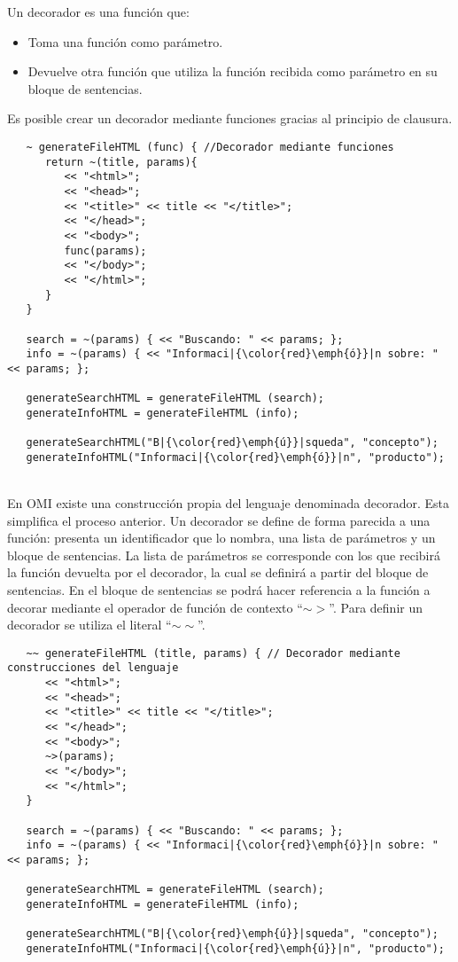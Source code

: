 Un decorador es una función que:
\begin{itemize}
\item Toma una función como parámetro. 
\item Devuelve otra función que utiliza la función recibida como parámetro en su bloque de sentencias.
\end{itemize}

Es posible crear un decorador mediante funciones gracias al principio de clausura. \\

\begin{lstlisting}
   ~ generateFileHTML (func) { //Decorador mediante funciones
      return ~(title, params){
         << "<html>";
         << "<head>";
         << "<title>" << title << "</title>";
         << "</head>";
         << "<body>";
         func(params);
         << "</body>";
         << "</html>";
      }
   }
   
   search = ~(params) { << "Buscando: " << params; };
   info = ~(params) { << "Informaci|{\color{red}\emph{ó}}|n sobre: " << params; };
   
   generateSearchHTML = generateFileHTML (search);
   generateInfoHTML = generateFileHTML (info);
   
   generateSearchHTML("B|{\color{red}\emph{ú}}|squeda", "concepto");
   generateInfoHTML("Informaci|{\color{red}\emph{ó}}|n", "producto");
\end{lstlisting}
\hfill\\ 

En OMI existe una construcción propia del lenguaje denominada decorador. Esta simplifica el 
proceso anterior. Un decorador se define de forma parecida a una función: presenta un identificador 
que lo nombra, una lista de parámetros y un bloque de sentencias. La lista de parámetros se corresponde 
con los que recibirá la función devuelta por el decorador, la cual se definirá a partir del 
bloque de sentencias. En el bloque de sentencias se podrá hacer referencia a la función a 
decorar mediante el operador de función de contexto ``$\sim>$''. Para definir un decorador se utiliza
el literal ``$\sim\sim$''. \\

\begin{lstlisting}
   ~~ generateFileHTML (title, params) { // Decorador mediante construcciones del lenguaje
      << "<html>";
      << "<head>";
      << "<title>" << title << "</title>";
      << "</head>";
      << "<body>";
      ~>(params);
      << "</body>";
      << "</html>";
   }
   
   search = ~(params) { << "Buscando: " << params; };
   info = ~(params) { << "Informaci|{\color{red}\emph{ó}}|n sobre: " << params; };
   
   generateSearchHTML = generateFileHTML (search);
   generateInfoHTML = generateFileHTML (info);
   
   generateSearchHTML("B|{\color{red}\emph{ú}}|squeda", "concepto");
   generateInfoHTML("Informaci|{\color{red}\emph{ú}}|n", "producto");
\end{lstlisting}
\hfill\\ 


